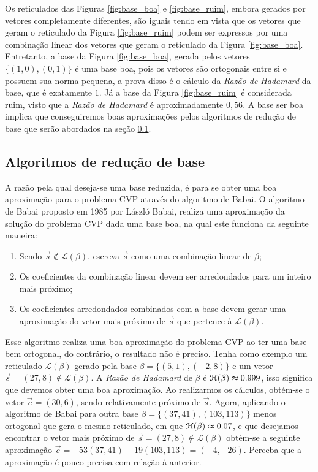     Os reticulados das Figuras \ref{fig:base_boa} e \ref{fig:base_ruim}, embora gerados por vetores completamente diferentes, são iguais tendo em vista que os vetores que geram o reticulado da Figura \ref{fig:base_ruim} podem ser expressos por uma combinação linear dos vetores que geram o reticulado da Figura \ref{fig:base_boa}. Entretanto, a base da Figura \ref{fig:base_boa}, gerada pelos vetores $\{(1,0),(0,1)\}$ é uma base boa, pois os vetores são ortogonais entre si e possuem sua norma pequena, a prova disso é o cálculo da \textit{Razão de Hadamard} da base, que é exatamente $1$. Já a base da Figura \ref{fig:base_ruim} é considerada ruim, visto que a \textit{Razão de Hadamard} é aproximadamente $0{,}56$. A base ser boa implica que conseguiremos boas aproximações pelos algoritmos de redução de base que serão abordados na seção \ref{algoritmos_reducao_base}.

    \subsection{Algoritmos de redução de base}
    \label{algoritmos_reducao_base}
        A razão pela qual deseja-se uma base reduzida, é para se obter uma boa aproximação para o problema \ac{CVP} através do algoritmo de Babai. O algoritmo de Babai \cite{babai} proposto em 1985 por László Babai, realiza uma aproximação da solução do problema CVP dada uma base boa, na qual este funciona da seguinte maneira:
        
        \begin{enumerate}
            \item Sendo $\vec{s} \notin \mathcal{L(\beta)}$, escreva $\vec{s}$ como uma combinação linear de $\beta$;
            \item Os coeficientes da combinação linear devem ser arredondados para um inteiro mais próximo;
            \item Os coeficientes arredondados combinados com a base devem gerar uma aproximação do vetor mais próximo de $\vec{s}$ que pertence à $\mathcal{L(\beta)}$.
        \end{enumerate}
        
        Esse algoritmo realiza uma boa aproximação do problema \ac{CVP} ao ter uma base bem ortogonal, do contrário, o resultado não é preciso. Tenha como exemplo um reticulado $\mathcal{L}(\beta)$ gerado pela base $\beta = \{ (5,1),(-2,8) \}$ e um vetor $\vec{s} = (27,8) \notin \mathcal{L}(\beta)$. A \textit{Razão de Hadamard} de $\beta$ é $\mathcal{H}(\beta) \thickapprox 0.999$, isso significa que devemos obter uma boa aproximação. Ao realizarmos os cálculos, obtém-se o vetor $\vec{c} = (30, 6)$, sendo relativamente próximo de $\vec{s}$. Agora, aplicando o algoritmo de Babai para outra base $\beta = \{(37,41),(103,113)\}$ menos ortogonal que gera o mesmo reticulado, em que  $\mathcal{H}(\beta) \thickapprox 0.07$, e que desejamos encontrar o vetor mais próximo de $\vec{s} = (27,8) \notin \mathcal{L}(\beta)$ obtém-se a seguinte aproximação $\vec{c} = -53(37,41) + 19(103,113) = (-4, -26)$. Perceba que a aproximação é pouco precisa com relação à anterior.
    
